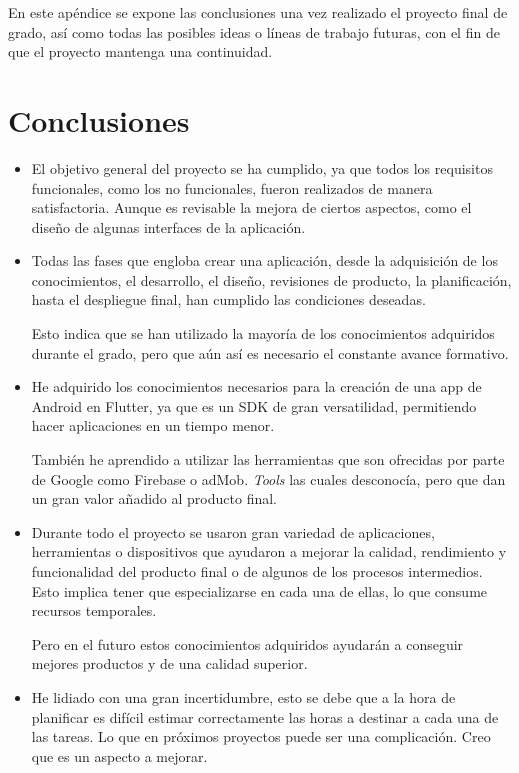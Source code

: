 
En este apéndice se expone las conclusiones una vez realizado el proyecto final de grado, así como todas las posibles ideas o líneas de trabajo futuras, con el fin de que el proyecto mantenga una continuidad.

\section{Conclusiones}

\begin{itemize}
	\item El objetivo general del proyecto se ha cumplido, ya que todos los requisitos funcionales, como los no funcionales, fueron realizados de manera satisfactoria. Aunque es revisable la mejora de ciertos aspectos, como el diseño de algunas interfaces de la aplicación.
		
	\item Todas las fases que engloba crear una aplicación, desde la adquisición de los conocimientos, el desarrollo, el diseño, revisiones de producto, la planificación, hasta el despliegue final, han cumplido las condiciones deseadas. 
	
	Esto indica que se han utilizado la mayoría de los conocimientos adquiridos durante el grado, pero que aún así es necesario el constante avance formativo.
	
	\item He adquirido los conocimientos necesarios para la creación de una app de Android en Flutter, ya que es un SDK de gran versatilidad, permitiendo hacer aplicaciones en un tiempo menor.
	
	 También he aprendido a utilizar las herramientas que son ofrecidas por parte de Google como Firebase o adMob. \emph{Tools} las cuales desconocía, pero que dan un gran valor añadido al producto final.
	
	\item Durante todo el proyecto se usaron gran variedad de aplicaciones, herramientas o dispositivos que ayudaron a mejorar la calidad, rendimiento y funcionalidad del producto final o de algunos de los procesos intermedios. Esto implica tener que especializarse en cada una de ellas, lo que consume recursos temporales.
	
	Pero en el futuro estos conocimientos adquiridos ayudarán a conseguir mejores productos y de una calidad superior.
	
	\item He lidiado con una gran incertidumbre, esto se debe que a la hora de planificar es difícil estimar correctamente las horas a destinar a cada una de las tareas. Lo que en próximos proyectos puede ser una complicación. Creo que es un aspecto a mejorar.
	

\end{itemize}
